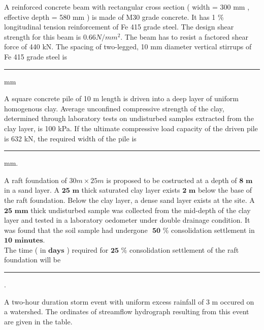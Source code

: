 \iffalse
\title{GATE Questions 20}
\author{EE24BTECH11012 - Bhavanisankar G S}
\section{ce}
\chapter{2022}
\fi
	\item A reinforced concrete beam with rectangular cross section ( width = 300 mm , effective depth = 580 mm ) is made of M30 grade concrete. It has 1 \% longitudinal tension reinforcement of Fe 415 grade steel. The design shear strength for this beam is $0.66 N/mm^2$. The beam has to resist a factored shear force of 440 kN. The spacing of two-legged, 10 mm diameter vertical stirrups of Fe 415 grade steel is \rule{1cm}{0.1pt} mm 
	\item A square concrete pile of 10 m length is driven into a deep layer of uniform homogenous clay. Average unconfined compressive strength of the clay, determined through laboratory tests on undisturbed samples extracted from the clay layer, is 100 kPa. If the ultimate compressive load capacity of the driven pile is 632 kN, the required width of the pile is \rule{1cm}{0.1pt} mm. 
	\item A raft foundation of \textbf{$30 m \times 25 m$} is proposed to be costructed at a depth of $\textbf{8 m}$ in a sand layer. A $\textbf{25 m}$ thick saturated clay layer exists $\textbf{2 m}$ below the base of the raft foundation. Below the clay layer, a dense sand layer exists at the site. A $\textbf{25 mm}$ thick undisturbed sample was collected from the mid-depth of the clay layer and tested in a laboratory oedometer under double drainage condition. It was found that the soil sample had undergone $\textbf{ 50 \%}$ consolidation settlement in $\textbf{10 minutes}$. \\
		The time ( in $\textbf{days}$ ) required for $\textbf{25 \%}$ consolidation settlement of the raft foundation will be \rule{1cm}{0.1pt}. 
	\item A two-hour duration storm event with uniform excess rainfall of 3 m occured on a watershed. The ordinates of streamflow hydrograph resulting from this event are given in the table. \\
